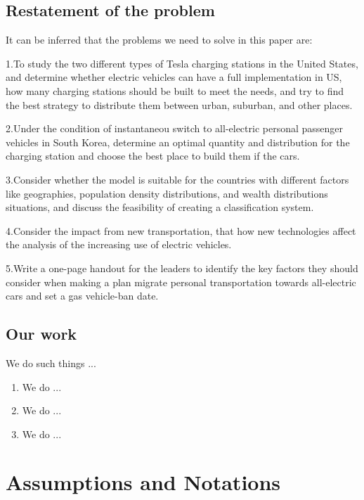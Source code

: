 \documentclass[12pt]{article}  %
\begin{document}
\subsection{Restatement of the problem}
It can be inferred that the problems we need to solve in this paper are:

1.To study the two different types of Tesla charging stations in the United States, and
determine whether electric vehicles can have a full implementation in US, how
many charging stations should be built to meet the needs, and try to find the best
strategy to distribute them between urban, suburban, and other places.

2.Under the condition of instantaneou switch to all-electric personal passenger vehicles in South Korea, determine an optimal quantity and distribution for the charging station and choose
the best place to build them if the cars.

3.Consider whether the model is suitable for the countries with different factors like geographies, population density distributions, and wealth distributions situations, and discuss the feasibility of creating a classification system.

4.Consider the impact from new transportation, that how new technologies affect the analysis of the increasing use of electric vehicles.
 
5.Write a one-page handout for the leaders to identify the key factors they should
consider when making a plan migrate personal transportation towards all-electric cars and set a gas vehicle-ban date.
\subsection{Our work}
We do such things ...

\begin{enumerate}[\bfseries 1.]
    \item We do ...
    \item We do ...
    \item We do ...
\end{enumerate}

\section{Assumptions and Notations}
\end{document}
